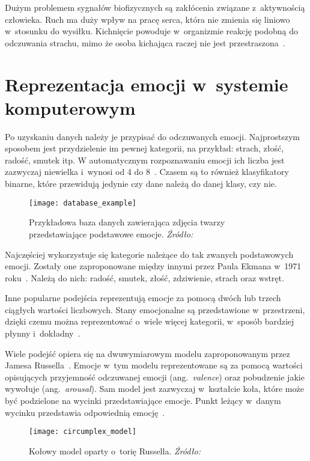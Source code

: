 Dużym problemem sygnałów biofizycznych są zakłócenia związane z~aktywnością człowieka.
Ruch ma duży wpływ na pracę serca, która nie zmienia się liniowo w~stosunku do wysiłku.
Kichnięcie powoduje w~organizmie reakcję podobną do odczuwania strachu, mimo że osoba kichająca raczej nie jest przestraszona~\cite{Calvo2015}.


\section{Reprezentacja emocji w~systemie komputerowym}\label{sec:reprezentacja-emocji-w-systemie-komputerowym}

Po uzyskaniu danych należy je przypisać do odczuwanych emocji.
Najprostszym sposobem jest przydzielenie im pewnej kategorii, na przykład: strach, złość, radość, smutek itp.
W automatycznym rozpoznawaniu emocji ich liczba jest zazwyczaj niewielka i~wynosi od 4 do 8~\cite{Dzedzickis2020}.
Czasem są to również klasyfikatory binarne, które przewidują jedynie czy dane należą do danej klasy, czy nie.

\begin{figure}[h]
    \centering
    \texttt{[image: database\_example]}
    \caption{Przykładowa baza danych zawierająca zdjęcia twarzy przedstawiające podstawowe emocje. \textit{Źródło:~\cite{Li2017}}}
    \label{fig:database-example}
\end{figure}

Najczęściej wykorzystuje się kategorie należące do tak zwanych podstawowych emocji.
Zostały one zaproponowane między innymi przez Paula Ekmana w~1971 roku~\cite{Ekman1971}.
Należą do nich: radość, smutek, złość, zdziwienie, strach oraz wstręt.

Inne popularne podejścia reprezentują emocje za pomocą dwóch lub trzech ciągłych wartości liczbowych.
Stany emocjonalne są przedstawione w~przestrzeni, dzięki czemu można reprezentować o~wiele więcej kategorii, w~sposób bardziej płynny i~dokładny~\cite{Calvo2015}.

Wiele podejść opiera się na dwuwymiarowym modelu zaproponowanym przez Jamesa Russella~\cite{Russell1980}.
Emocje w~tym modelu reprezentowane są za pomocą wartości opisujących przyjemność odczuwanej emocji (ang.~\textit{valence}) oraz pobudzenie jakie wywołuje (ang.~\textit{arousal}).
Sam model jest zazwyczaj w~kształcie koła, które może być podzielone na wycinki przedstawiające emocje.
Punkt leżący w~danym wycinku przedstawia odpowiednią emocję~\cite{Dzedzickis2020}.

\begin{figure}[h]
    \centering
    \texttt{[image: circumplex\_model]}
    \caption{Kołowy model oparty o~torię Russella. \textit{Źródło:~\cite{Dzedzickis2020}}}
    \label{fig:circumplex-model}
\end{figure}

